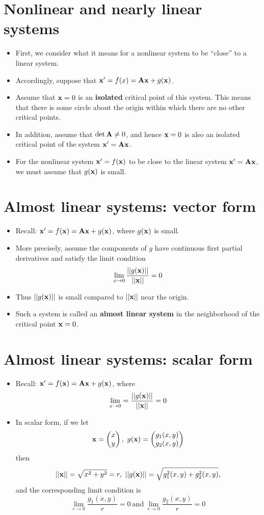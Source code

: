 \documentclass[11pt,a4paper]{article}
\begin{document}
	\section*{Nonlinear and nearly linear systems}
	\begin{itemize}
		\item First, we consider what it means for a nonlinear system to be “close” to a linear system.
		\item Accordingly, suppose that $\vb{x}^\prime = f(x) = \vb{Ax} + g(\vb{x})$.
		\item Assume that $\vb{x} = 0$ is an \textbf{isolated} critical point of this system. This means that there is some circle about the origin within which there are no other critical points.
		\item In addition, assume that $\det \vb{A} \neq 0$, and hence $\vb{x} = 0$ is also an isolated critical point of the system $\vb{x}^\prime = \vb{Ax}$.
		\item For the nonlinear system $\vb{x}^\prime = f(\vb{x})$ to be close to the linear system $\vb{x}^\prime = \vb{Ax}$, we must assume that $g(\vb{x})$ is small.
	\end{itemize}
	\section*{Almost linear systems: vector form}
	\begin{itemize}
		\item Recall: $\vb{x}^\prime = f(\vb{x}) = \vb{Ax} + g(\vb{x})$, where $g(\vb{x})$ is small.
		\item More precisely, assume the components of $g$ have continuous first partial derivatives and satisfy the limit condition
		$$
		\lim_{x\to 0}\frac{||g(\vb{x})||}{||\vb{x}||} = 0
		$$
		\item Thus $||g(\vb{x})||$ is small compared to $||\vb{x}||$ near the origin.
		\item Such a system is called an \textbf{almost linear system} in the neighborhood of the critical point $\vb{x} = 0$.
	\end{itemize}
	\section*{Almost linear systems: scalar form}
	\begin{itemize}
		\item Recall: $\vb{x}^\prime = f(\vb{x}) = \vb{Ax} + g(\vb{x})$, where
		$$
		\lim_{x\to 0} = \frac{||g(\vb{x})||}{||\vb{x}||} = 0
		$$
		\item In scalar form, if we let
		$$
		\vb{x} =
		\begin{pmatrix}
			x\\
			y
		\end{pmatrix},\ g(\vb{x}) =
		\begin{pmatrix}
			g_1(x,y)\\
			g_2(x,y)
		\end{pmatrix}
		$$
		then
		$$
		||\vb{x}|| = \sqrt{x^2 + y^2} = r,\ ||g(\vb{x})|| = \sqrt{g_1^2(x,y)+g_2^2(x,y)},
		$$
		and the corresponding limit condition is
		$$
		\lim_{r\to 0}\frac{g_1(x,y)}{r} = 0\ \text{and}\ \lim_{r\to 0}\frac{g_2(x,y)}{r} = 0
		$$
	\end{itemize}
\end{document}
